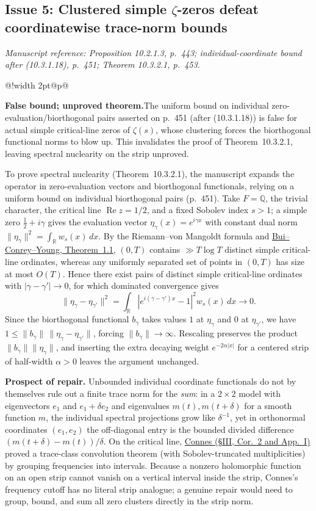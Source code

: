 \documentclass[11pt,letterpaper]{article}
\makeatletter
\newcommand{\msloc}[1]{%
  {\small\color{locgray}\itshape Manuscript reference: #1.}\par\nobreak\vspace{3pt}\@afterindentfalse\@afterheading
}
\newcommand{\issuefinding}[2]{%
  \begingroup
  \setlength{\fboxsep}{0pt}%
  \noindent\colorbox{barbg}{%
    \begin{tabular}{@{}!{\color{baraccent}\vrule width 2pt}@{\hspace{8pt}}p{\dimexpr\linewidth-18pt\relax}@{\hspace{8pt}}}
      \rule{0pt}{11.5pt}\small\textbf{\color{baraccent}#1}\enspace #2\rule[-4.5pt]{0pt}{0pt}
    \end{tabular}%
  }%
  \endgroup
  \par\nobreak\vspace{4.5pt}\@afterindentfalse\@afterheading
}
\newcommand{\Q}{\mathbb{Q}}
\newcommand{\R}{\mathbb{R}}
\newcommand{\dd}{\,d}
\DeclareMathOperator{\RePt}{Re}
\makeatother
\begin{document}
\subsection{Issue 5: Clustered simple \texorpdfstring{$\zeta$}{zeta}-zeros defeat coordinatewise trace-norm bounds}
\msloc{Proposition 10.2.1.3, p.~443; individual-coordinate bound after (10.3.1.18), p.~451; Theorem 10.3.2.1, p.~453}
\issuefinding{False bound; unproved theorem.}{The uniform bound on individual zero-evaluation/biorthogonal pairs asserted on p.~451 (after (10.3.1.18)) is false for actual simple critical-line zeros of $\zeta(s)$, whose clustering forces the biorthogonal functional norms to blow up. This invalidates the proof of Theorem~10.3.2.1, leaving spectral nuclearity on the strip unproved.}

To prove spectral nuclearity (Theorem~10.3.2.1), the manuscript expands the operator in zero-evaluation vectors and biorthogonal functionals, relying on a uniform bound on individual biorthogonal pairs (p.~451). Take $F=\Q$, the trivial character, the critical line $\RePt z = 1/2$, and a fixed Sobolev index $s>1$; a simple zero $\frac{1}{2}+i\gamma$ gives the evaluation vector $\eta_\gamma(x) = e^{i\gamma x}$ with constant dual norm $\|\eta_\gamma\|^2 = \int_{\R} w_s(x)\dd x$. By the Riemann--von Mangoldt formula and \href{https://arxiv.org/pdf/1002.4127}{Bui--Conrey--Young, Theorem~1.1}, $(0,T)$ contains $\gg T\log T$ distinct simple critical-line ordinates, whereas any uniformly separated set of points in $(0,T)$ has size at most $O(T)$. Hence there exist pairs of distinct simple critical-line ordinates with $|\gamma-\gamma'|\to 0$, for which dominated convergence gives
\[
  \|\eta_\gamma - \eta_{\gamma'}\|^2 = \int_{\R} |e^{i(\gamma-\gamma')x} - 1|^2 w_s(x)\dd x \longrightarrow 0.
\]
Since the biorthogonal functional $b_\gamma$ takes values $1$ at $\eta_\gamma$ and $0$ at $\eta_{\gamma'}$, we have $1 \le \|b_\gamma\|\,\|\eta_\gamma - \eta_{\gamma'}\|$, forcing $\|b_\gamma\|\to\infty$. Rescaling preserves the product $\|b_\gamma\|\|\eta_\gamma\|$, and inserting the extra decaying weight $e^{-2\alpha|x|}$ for a centered strip of half-width $\alpha>0$ leaves the argument unchanged.

\textbf{Prospect of repair.} Unbounded individual coordinate functionals do not by themselves rule out a finite trace norm for the \emph{sum}: in a $2\times 2$ model with eigenvectors $e_1$ and $e_1 + \delta e_2$ and eigenvalues $m(t), m(t+\delta)$ for a smooth function $m$, the individual spectral projections grow like $\delta^{-1}$, yet in orthonormal coordinates $(e_1,e_2)$ the off-diagonal entry is the bounded divided difference $(m(t+\delta)-m(t))/\delta$. On the critical line, \href{https://arxiv.org/pdf/math/9811068}{Connes (\S III, Cor.~2 and App.~I)} proved a trace-class convolution theorem (with Sobolev-truncated multiplicities) by grouping frequencies into intervals. Because a nonzero holomorphic function on an open strip cannot vanish on a vertical interval inside the strip, Connes's frequency cutoff has no literal strip analogue; a genuine repair would need to group, bound, and sum all zero clusters directly in the strip norm.
\end{document}
